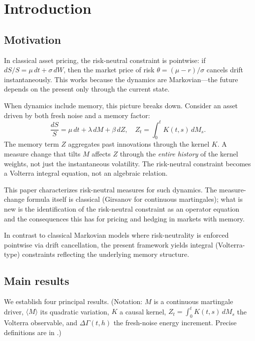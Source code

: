 \documentclass[11pt]{article}
\theoremstyle{plain}
\theoremstyle{definition}
\theoremstyle{remark}
\newcommand{\dGamma}{\Delta\Gamma}
\newcommand{\bracket}[1]{\langle #1 \rangle}
\begin{document}
\tableofcontents

\section{Introduction}\label{sec:intro}

\subsection{Motivation}

In classical asset pricing, the risk-neutral constraint is pointwise: if
$dS/S = \mu\,dt + \sigma\,dW$, then the market price of risk $\theta = (\mu - r)/\sigma$
cancels drift instantaneously. This works because the dynamics are Markovian---the
future depends on the present only through the current state.

When dynamics include memory, this picture breaks down. Consider an asset driven
by both fresh noise and a memory factor:
\[
\frac{dS}{S} = \mu\,dt + \lambda\,dM + \beta\,dZ, \quad
Z_t = \int_0^t K(t,s)\,dM_s.
\]
The memory term $Z$ aggregates past innovations through the kernel $K$. A
measure change that tilts $M$ affects $Z$ through the \emph{entire history}
of the kernel weights, not just the instantaneous volatility. The risk-neutral
constraint becomes a Volterra integral equation, not an algebraic relation.

This paper characterizes risk-neutral measures for such dynamics. The measure-change
formula itself is classical (Girsanov for continuous martingales); what is new
is the identification of the risk-neutral constraint as an operator equation
and the consequences this has for pricing and hedging in markets with memory.

In contrast to classical Markovian models where risk-neutrality is enforced
pointwise via drift cancellation, the present framework yields integral
(Volterra-type) constraints reflecting the underlying memory structure.

\subsection{Main results}

We establish four principal results. (Notation: $M$ is a continuous martingale
driver, $\bracket{M}$ its quadratic variation, $K$ a causal kernel,
$Z_t = \int_0^t K(t,s)\,dM_s$ the Volterra observable, and $\dGamma(t,h)$ the
fresh-noise energy increment. Precise definitions are in .)
\end{document}
